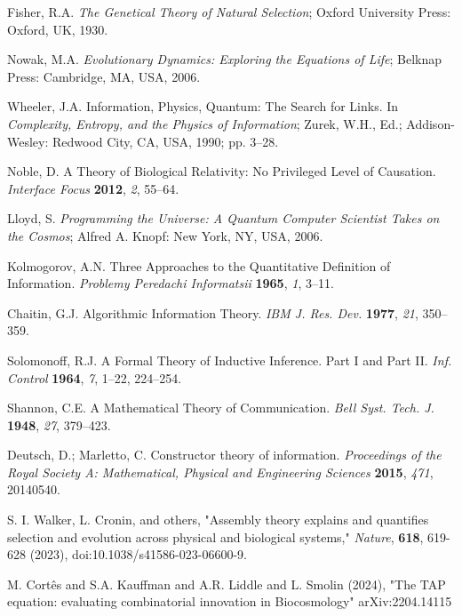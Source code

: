 \documentclass[preprint,12pt]{elsarticle}
\begin{document}
\begin{thebibliography}{999}
Fisher, R.A. \textit{The Genetical Theory of Natural Selection}; Oxford University Press: Oxford, UK, 1930.

Nowak, M.A. \textit{Evolutionary Dynamics: Exploring the Equations of Life}; Belknap Press: Cambridge, MA, USA, 2006.

Wheeler, J.A. Information, Physics, Quantum: The Search for Links. In \textit{Complexity, Entropy, and the Physics of Information}; Zurek, W.H., Ed.; Addison-Wesley: Redwood City, CA, USA, 1990; pp. 3–28.

Noble, D. A Theory of Biological Relativity: No Privileged Level of Causation. \textit{Interface Focus} \textbf{2012}, \textit{2}, 55–64.

Lloyd, S. \textit{Programming the Universe: A Quantum Computer Scientist Takes on the Cosmos}; Alfred A. Knopf: New York, NY, USA, 2006.

Kolmogorov, A.N. Three Approaches to the Quantitative Definition of Information. \textit{Problemy Peredachi Informatsii} \textbf{1965}, \textit{1}, 3–11.

Chaitin, G.J. Algorithmic Information Theory. \textit{IBM J. Res. Dev.} \textbf{1977}, \textit{21}, 350–359. 

Solomonoff, R.J. A Formal Theory of Inductive Inference. Part I and Part II. \textit{Inf. Control} \textbf{1964}, \textit{7}, 1–22, 224–254.

Shannon, C.E. A Mathematical Theory of Communication. \textit{Bell Syst. Tech. J.} \textbf{1948}, \textit{27}, 379–423.

Deutsch, D.; Marletto, C. Constructor theory of information. \textit{Proceedings of the Royal Society A: Mathematical, Physical and Engineering Sciences} \textbf{2015}, \textit{471}, 20140540. 

S. I. Walker, L. Cronin, and others,
"Assembly theory explains and quantifies selection and evolution across physical and biological systems," \textit{Nature}, \textbf{618}, 619-628 (2023), doi:10.1038/s41586-023-06600-9.

M. Cortês and S.A. Kauffman and A.R. Liddle and L. Smolin (2024), "The TAP equation: evaluating combinatorial innovation in Biocosmology" arXiv:2204.14115



\end{thebibliography}
\end{document}
